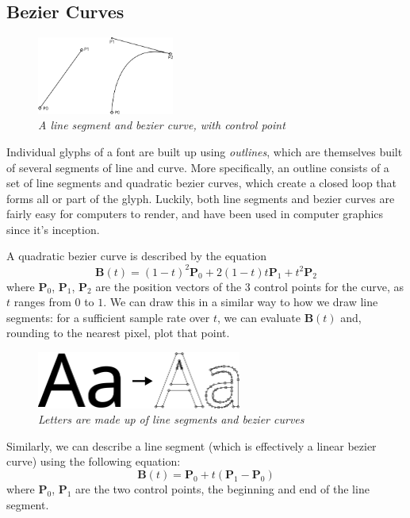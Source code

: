 \documentclass{report}
\begin{document}
\subsection{Bezier Curves}
\begin{figure}
  \centering
  \includegraphics[width=0.4\textwidth]{bezier2img}
  \caption{\textit{A line segment and bezier curve, with control point}}
\end{figure}
Individual glyphs of a font are built up using \textit{outlines}, which are
themselves built of several segments of line and curve. More specifically, an
outline consists of a set of line segments and quadratic bezier curves, which
create a closed loop that forms all or part of the glyph. Luckily, both line
segments and bezier curves are fairly easy for computers to render, and have
been used in computer graphics since it's inception.

A quadratic bezier curve is described by the equation
\begin{equation*}
\mathbf{B}(t) = (1 - t)^2\mathbf{P}_0 +2(1 - t)t\mathbf{P}_1 + t^2\mathbf{P}_2
\end{equation*}
where $\mathbf{P}_0$, $\mathbf{P}_1$, $\mathbf{P}_2$ are the position vectors of
the 3 control points for the curve, as $t$ ranges from $0$ to $1$. We can draw
this in a similar way to how we draw line segments: for a sufficient sample rate
over $t$, we can evaluate $\mathbf{B}(t)$ and, rounding to the nearest pixel,
plot that point.
\begin{figure}[t]
\centering
\includegraphics[width=0.6\textwidth]{outlineimg}
\caption{\textit{Letters are made up of line segments and bezier curves}}
\end{figure}
Similarly, we can describe a line segment (which is effectively a linear bezier
curve) using the following equation:
\begin{equation*}
  \mathbf{B}(t) = \mathbf{P}_0 + t(\mathbf{P}_1 - \mathbf{P}_0)
\end{equation*}
where $\mathbf{P}_0$, $\mathbf{P}_1$ are the two control points, the beginning
and end of the line segment. 
\end{document}
